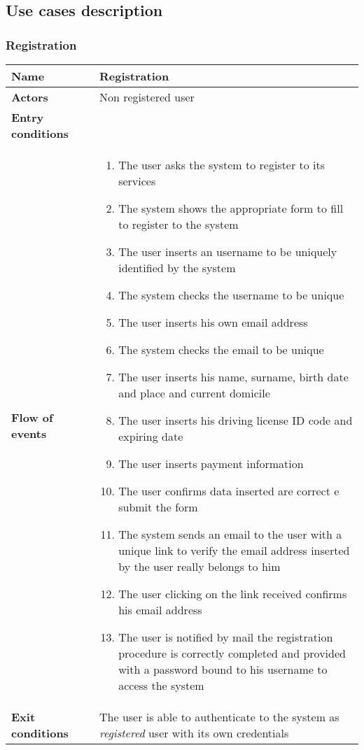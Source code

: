 \subsection{Use cases description}

\subsubsection{Registration}
\begin{longtable}{p{0.25\linewidth}p{0.75\linewidth}}
\toprule
\textbf{Name} & \textbf{Registration} \\
\midrule
\textbf{Actors} & Non registered user \\
\midrule
\textbf{Entry conditions} & \\
\midrule
\textbf{Flow of events} & 
\begin{enumerate}
	\item The user asks the system to register to its services
	\item The system shows the appropriate form to fill to register to the system
	\item The user inserts an username to be uniquely identified by the system
	\item The system checks the username to be unique
	\item The user inserts his own email address
	\item The system checks the email to be unique
	\item The user inserts his name, surname, birth date and place and current domicile
	\item The user inserts his driving license ID code and expiring date
	\item The user inserts payment information
	\item The user confirms data inserted are correct e submit the form
	\item The system sends an email to the user with a unique link to verify the email address inserted by the user really belongs to him
	\item The user clicking on the link received confirms his email address
	\item The user is notified by mail the registration procedure is correctly completed and
	provided with a password bound to his username to access the system
\end{enumerate} \\
\midrule
\textbf{Exit conditions} & The user is able to authenticate to the system as \emph{registered} user with its own credentials\\

\end{longtable}
